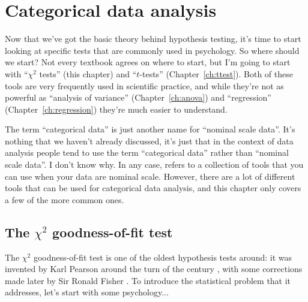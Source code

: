 
\chapter{Categorical data analysis\label{ch:chisquare}}


Now that we've got the basic theory behind hypothesis testing, it's time to start looking at specific tests that are commonly used in psychology. So where should we start? Not every textbook agrees on where to start, but I'm going to start with ``$\chi^2$ tests'' (this chapter) and ``$t$-tests'' (Chapter~\ref{ch:ttest}). Both of these tools are very frequently used in scientific practice, and while they're not as powerful as ``analysis of variance'' (Chapter~\ref{ch:anova}) and ``regression'' (Chapter~\ref{ch:regression}) they're much easier to understand.

The term ``categorical data'' is just another name for ``nominal scale data''. It's nothing that we haven't already discussed, it's just that in the context of data analysis people tend to use the term ``categorical data'' rather than ``nominal scale data''. I don't know why. In any case,  refers to a collection of tools that you can use when your data are nominal scale. However, there are a lot of different tools that can be used for categorical data analysis, and this chapter only covers a few of the more common ones.


\section{The $\chi^2$ goodness-of-fit test~\label{sec:goftest}}

The $\chi^2$ goodness-of-fit test is one of the oldest hypothesis tests around: it was invented by Karl Pearson around the turn of the century \parencite{Pearson1900}, with some corrections made later by  Sir Ronald Fisher \parencite{Fisher1922}. To introduce the statistical problem that it addresses, let's start with some psychology... 


